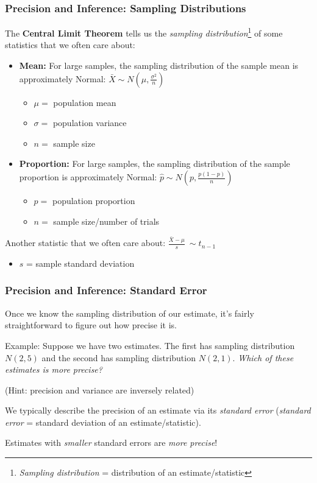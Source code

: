 \documentclass[12pt, 
hyperref={colorlinks=true, linkcolor=blue, urlcolor=cyan}]{beamer}
\begin{document}
\begin{frame}
\frametitle{Precision and Inference: Sampling Distributions}

The \textbf{Central Limit Theorem} tells us the \textit{sampling distribution}\footnote[frame]{\textit{Sampling distribution} = distribution of an estimate/statistic} of some statistics that we often care about: \vspace{-0.4cm}

\begin{itemize}
\item \textbf{Mean:} For large samples, \color{blue}the sampling distribution of the sample mean is approximately Normal\color{black}: $\bar{X} \sim N(\mu,\frac{\sigma^2}{n})$
	\begin{itemize}
	\item $\mu =$ population mean
	\item $\sigma =$ population variance
	\item $n =$ sample size
	\end{itemize}
\pause
\item \textbf{Proportion:}  For large samples, \color{blue}the sampling distribution of the sample proportion is approximately Normal\color{black}: $\hat{p} \sim N(p,\frac{p(1-p)}{n})$
	\begin{itemize}
	\item $p =$ population proportion
	\item $n =$ sample size/number of trials
	\end{itemize}
\end{itemize} \vspace{-0.4cm}
\pause
Another statistic that we often care about: $\frac{\bar{X}-\mu}{s} ~\sim t_{n-1}$ \vspace{-0.4cm}
\begin{itemize}
\item $s$ = sample standard deviation
\end{itemize}
\end{frame}

\begin{frame}
\frametitle{Precision and Inference: Standard Error}

Once we know the sampling distribution of our estimate, it's fairly straightforward to figure out how precise it is.

\color{blue} Example: \color{black} Suppose we have two estimates. The first has sampling distribution $N(2,5)$ and the second has sampling distribution $N(2,1)$. \textit{Which of these estimates is more precise?}

\pause
\begin{footnotesize} (Hint: precision and variance are inversely related) \end{footnotesize}

\pause
We typically describe the precision of an estimate via its \textit{standard error} (\textit{standard error} = standard deviation of an estimate/statistic).

Estimates with \textit{smaller} standard errors are \textit{more precise}!
\end{frame}
\end{document}
